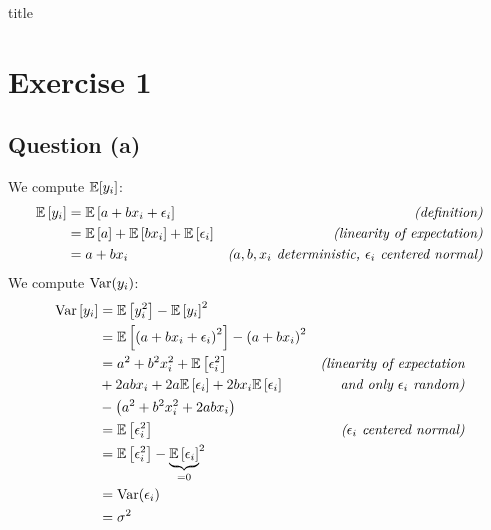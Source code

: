 \documentclass[12pt]{article}
\begin{document}
{title}

\restoregeometry
{}
\tableofcontents

\clearpage
{}

\section{Exercise 1}
\subsection{Question (a)}
We compute \(\mathbb{E}[y_i]\):
\begin{align*}
    \mathbb{E} \left[ y_i \right]
     & = \mathbb{E} \left[ a + bx_i + \epsilon_i \right]                                      & \textit{(definition)}                                                  \\
     & = \mathbb{E} \left[ a \right] + \mathbb{E} \left[ b x_i \right] + \mathbb{E} \left[ \epsilon_i \right] & \textit{(linearity of expectation)}                                    \\
     & = a + b x_i                                                                    & \textit{(\(a, b, x_i\) deterministic, \(\epsilon_i\) centered normal)} \\
\end{align*}
We compute \(\textrm{Var}(y_i)\):
\begin{align*}
    \textrm{Var} \left[ y_i \right]
     & = \mathbb{E} \left[ y_i^2 \right] - \mathbb{E} \left[ y_i \right]^2                                                                              \\
     & = \mathbb{E} \left[ \left(a + bx_i + \epsilon_i \right)^2 \right] - \left(a + b x_i\right)^2                                             \\
     & = a^2 + b^2x_i^2 + \mathbb{E}\left[\epsilon_i^2\right]                                       & \textit{(linearity of expectation}        \\
     & + 2abx_i + 2a \mathbb{E} \left[\epsilon_i\right] + 2bx_i \mathbb{E}\left[\epsilon_i \right]          & \textit{and only \(\epsilon_i\) random)}  \\
     & - \left(a^2 + b^2x_i^2 + 2abx_i\right)                                                                                           \\
     & = \mathbb{E}\left[\epsilon_i^2\right]                                                        & \textit{(\(\epsilon_i\) centered normal)} \\
     & = \mathbb{E}\left[\epsilon_i^2\right] - {\underbrace{\mathbb{E}\left[\epsilon_i\right]}_{=0}}^2                                                  \\
     & = \textrm{Var}(\epsilon_i)                                                                                                               \\
     & = \sigma^2                                                                                                                       \\
\end{align*}
\end{document}
